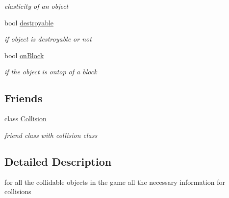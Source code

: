 \begin{DoxyCompactItemize}
\begin{DoxyCompactList}\small\item\em elasticity of an object \end{DoxyCompactList}\item 
\hypertarget{class_collidable_a73fd10e1d843cd7c3d7e69eeb5582b83}{bool \hyperlink{class_collidable_a73fd10e1d843cd7c3d7e69eeb5582b83}{destroyable}}\label{class_collidable_a73fd10e1d843cd7c3d7e69eeb5582b83}

\begin{DoxyCompactList}\small\item\em if object is destroyable or not \end{DoxyCompactList}\item 
\hypertarget{class_collidable_a12e15868001ed209e3833ff43bf20792}{bool \hyperlink{class_collidable_a12e15868001ed209e3833ff43bf20792}{on\-Block}}\label{class_collidable_a12e15868001ed209e3833ff43bf20792}

\begin{DoxyCompactList}\small\item\em if the object is ontop of a block \end{DoxyCompactList}\end{DoxyCompactItemize}
\subsection*{Friends}
\begin{DoxyCompactItemize}
\item 
\hypertarget{class_collidable_aa08e39e5a8a0a97f10c15f0c5d98013b}{class \hyperlink{class_collidable_aa08e39e5a8a0a97f10c15f0c5d98013b}{Collision}}\label{class_collidable_aa08e39e5a8a0a97f10c15f0c5d98013b}

\begin{DoxyCompactList}\small\item\em friend class with collision class \end{DoxyCompactList}\end{DoxyCompactItemize}


\subsection{Detailed Description}
for all the collidable objects in the game  all the necessary information for collisions 


